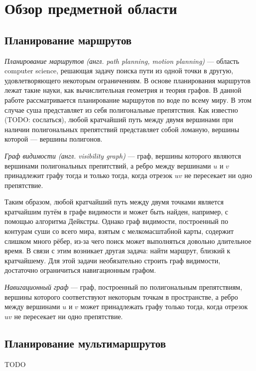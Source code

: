 \chapter{Обзор предметной области}

\FloatBarrier
\section{Планирование маршрутов}

\emph{Планирование маршрутов (англ. path planning, motion planning)} ---
область computer science, решающая задачу поиска пути из одной точки в
другую, удовлетворяющего некоторым ограничениям. В основе
планирования маршрутов лежат такие науки, как вычислительная геометрия
и теория графов. В данной работе рассматривается планирование
маршрутов по воде по всему миру. В этом случае суша представляет из
себя полигональные препятствия. Как известно (TODO: сослаться), любой
кратчайший путь между двумя вершинами при наличии полигональных препятствий
представляет собой ломаную, вершины которой --- вершины полигонов. 

\emph{Граф видимости (англ. visibility graph)} --- граф, вершины
которого являются вершинами полигональных препятствий, а ребро между
вершинами $u$ и $v$ принадлежит графу тогда и только тогда, когда
отрезок $uv$ не пересекает ни одно препятствие.

Таким образом, любой кратчайший путь между двумя точками является
кратчайшим путём в графе видимости и может быть найден, например, с
помощью алгоритма Дейкстры. Однако граф видимости, построенный по
контурам суши со всего мира, взятым с мелкомасштабной карты, содержит
слишком много рёбер, из-за чего поиск может выполняться довольно
длительное время. В связи с этим возникает другая задача: найти
маршрут, близкий к кратчайшему. Для этой задачи необязательно строить
граф видимости, достаточно ограничиться навигационным графом.

\emph{Навигационный граф} --- граф, построенный по полигональным
препятствиям, вершины которого соответствуют некоторым точкам в
пространстве, а ребро между вершинами $u$ и $v$ может принадлежать графу только
тогда, когда отрезок $uv$ не пересекает ни одно препятствие.

\section{Планирование мультимаршрутов}

TODO


